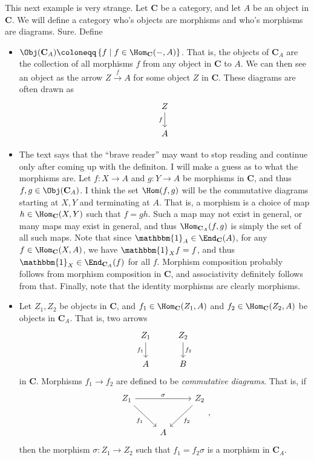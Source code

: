 This next example is very strange. Let $\mathbf{C}$ be a category, and let  $A$ be an object in $\mathbf{C}$. We will define a category who's objects are morphisms and who's morphisms are diagrams. Sure. Define
\begin{itemize}
	\item $\Obj( \mathbf{C}_A ) \coloneqq \left\{ f \mid f\in \Hom_{\mathbf{C}}(- , A)  \right\} $. That is, the objects of $\mathbf{C}_A$ are the collection of all morphisms $f$ from any object in $\mathbf{C}$ to $A$. We can then see an object as the arrow $Z\xrightarrow{f}A$ for some object $Z$ in $\mathbf{C}$. These diagrams are often drawn as
		\[
			\begin{tikzcd}
				Z \arrow[d,"f"']\\
				A
			\end{tikzcd}
		\]
	\item The text says that the ``brave reader'' may want to stop reading and continue only after coming up with the definiton. I will make a guess as to what the morphisms are. Let $f : X \to A$ and $g : Y \to A$ be morphisms in $\mathbf{C}$, and thus $f,g\in \Obj( \mathbf{C}_A ) $. I think the set $\Hom(f , g) $ will be the commutative diagrams starting at $X,Y$ and terminating at $A$. That is, a morphism is a choice of map $h\in \Hom_{\mathbf{C}}(X , Y) $ such that $f=gh$. Such a map may not exist in general, or many maps may exist in general, and thus $\Hom_{\mathbf{C}_A}(f , g) $ is simply the set of all such maps. Note that since $\mathbbm{1}_{A} \in \End_{\mathbf{C}}(A) $, for any $f\in \Hom_{\mathbf{C}}(X , A) $, we have $\mathbbm{1}_{X}f =f$, and thus $\mathbbm{1}_{X} \in\End_{\mathbf{C}_A}(f) $ for all $f$. Morphism composition probably follows from morphism composition in $\mathbf{C}$, and associativity definitely follows from that. Finally, note that the identity morphisms are clearly morphisms.
	\item Let $Z_1,Z_2$ be objects in $\mathbf{C}$, and $f_1\in \Hom_{\mathbf{C}}(Z_1 , A) $ and $f_2\in \Hom_{\mathbf{C}}(Z_2 , A) $ be objects in $\mathbf{C}_A$. That is, two arrows
		\[
			\begin{tikzcd}
				Z_1\arrow[d,"f_1"']&Z_2\arrow[d,"f_2"]\\
				A&B
			\end{tikzcd}
		\]
		in $\mathbf{C}$. Morphisms $f_1 \to f_2$ are defined to be \emph{commutative diagrams}. That is, if
		\[
			\begin{tikzcd}[row sep=2.5em, column sep=2.5em]
				Z_1 \arrow[rr, "\sigma "] \arrow [dr, "f_1"'] && Z_2 \arrow[dl, "f_2"]\\
									     &A
			\end{tikzcd}
		,\]
		 then the morphism $\sigma : Z_1 \to Z_2$ such that $f_1 = f_2 \sigma $ is a morphism in $\mathbf{C}_A$.
\end{itemize}
